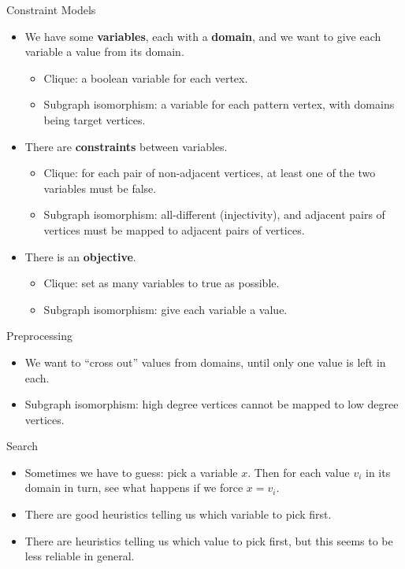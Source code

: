 \documentclass{beamer}
\begin{document}
\begin{frame}{Constraint Models}
    \begin{itemize}
        \item We have some \textbf{variables}, each with a \textbf{domain}, and we want to give each
            variable a value from its domain.
            \begin{itemize}
                \item Clique: a boolean variable for each vertex.
                \item Subgraph isomorphism: a variable for each pattern vertex, with domains being
                    target vertices.
            \end{itemize}
        \item There are \textbf{constraints} between variables.
            \begin{itemize}
                \item Clique: for each pair of non-adjacent vertices, at least one of the two
                    variables must be false.
                \item Subgraph isomorphism: all-different (injectivity), and adjacent pairs of
                    vertices must be mapped to adjacent pairs of vertices.
            \end{itemize}
        \item There is an \textbf{objective}.
            \begin{itemize}
                \item Clique: set as many variables to true as possible.
                \item Subgraph isomorphism: give each variable a value.
            \end{itemize}
    \end{itemize}
\end{frame}

\begin{frame}{Preprocessing}
    \begin{itemize}
        \item We want to ``cross out'' values from domains, until only one value is left in each.
        \item Subgraph isomorphism: high degree vertices cannot be mapped to low degree vertices.
    \end{itemize}
\end{frame}

\begin{frame}{Search}
    \begin{itemize}
        \item Sometimes we have to guess: pick a variable $x$. Then for each value $v_i$ in its
            domain in turn, see what happens if we force $x = v_i$.
        \item There are good heuristics telling us which variable to pick first.
        \item There are heuristics telling us which value to pick first, but this seems to be
            less reliable in general.
    \end{itemize}
\end{frame}
\end{document}

